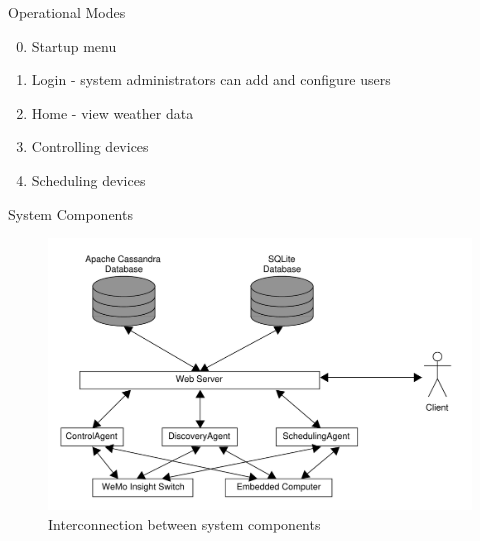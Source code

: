 \documentclass{beamer}
\begin{document}
\begin{frame}{Operational Modes}{}
    \begin{enumerate}
        \setcounter{enumi}{-1}
        \item Startup menu
        \item Login - system administrators can add and configure users
        \item Home - view weather data
        \item Controlling devices
        \item Scheduling devices
    \end{enumerate}
\end{frame}

\begin{frame}{System Components}{}
    \begin{figure}
        \centering
        \includegraphics[scale=0.4]{figs/overallDiagram.pdf}
        \caption{Interconnection between system components}
        \label{fig:systemComponentInterconnection}
    \end{figure}
\end{frame}
\end{document}
